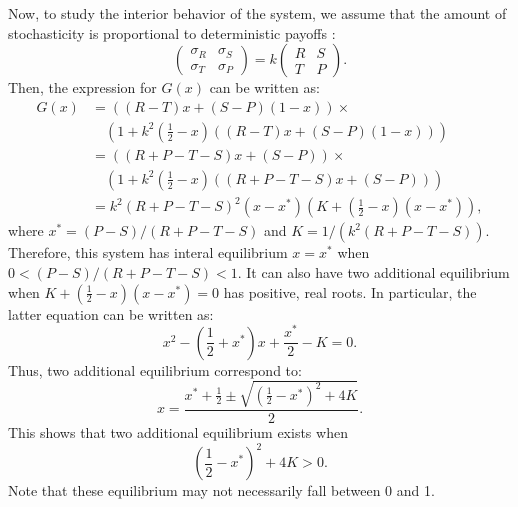 \documentclass[12pt]{article}
\begin{document}
Now, to study the interior behavior of the system, we assume that the amount of stochasticity is proportional to deterministic payoffs \citep{wang2025evolution}:
\begin{equation}
 \begin{pmatrix}
\sigma_R & \sigma_S \\
\sigma_T & \sigma_P
\end{pmatrix} =k \begin{pmatrix}
R & S \\
T & P
\end{pmatrix}.
\end{equation}
Then, the expression for $G(x)$ can be written as:
\begin{align}
G(x) &= \left( (R-T)x + (S-P)(1-x) \right) \times\\
&\quad{}\left(1+ k^2 \left(\frac{1}{2} - x \right) ((R-T)x + (S-P)(1-x))\right)\\
&= \left( (R+P-T-S)x + (S-P) \right) \times\\
&\quad{}\left(1+ k^2 \left(\frac{1}{2} - x \right) ((R+P-T-S)x + (S-P))\right)\\
&= k^2 (R+P-T-S)^2 \left(x-x^\ast \right) \left(K + \left(\frac{1}{2} - x \right) (x - x^\ast)\right),
\end{align}
where $x^\ast = (P-S)/(R+P-T-S)$ and $K = 1/(k^2(R+P-T-S))$.
Therefore, this system has interal equilibrium $x=x^\ast$ when $0 < (P-S)/(R+P-T-S) < 1$.
It can also have two additional equilibrium when $K + \left(\frac{1}{2} - x \right) (x - x^\ast) = 0$ has positive, real roots.
In particular, the latter equation can be written as:
\begin{equation}
x^2 -\left(\frac{1}{2} + x^\ast \right) x + \frac{x^\ast}{2} - K = 0.
\end{equation}
Thus, two additional equilibrium correspond to:
\begin{equation}
x = \frac{x^\ast + \frac{1}{2} \pm \sqrt{\left(\frac{1}{2} - x^\ast \right)^2 + 4K}}{2}.
\end{equation}
This shows that two additional equilibrium exists when 
\begin{equation}
\left(\frac{1}{2} - x^\ast \right)^2 + 4K > 0.
\end{equation}
Note that these equilibrium may not necessarily fall between 0 and 1.


\end{document}
